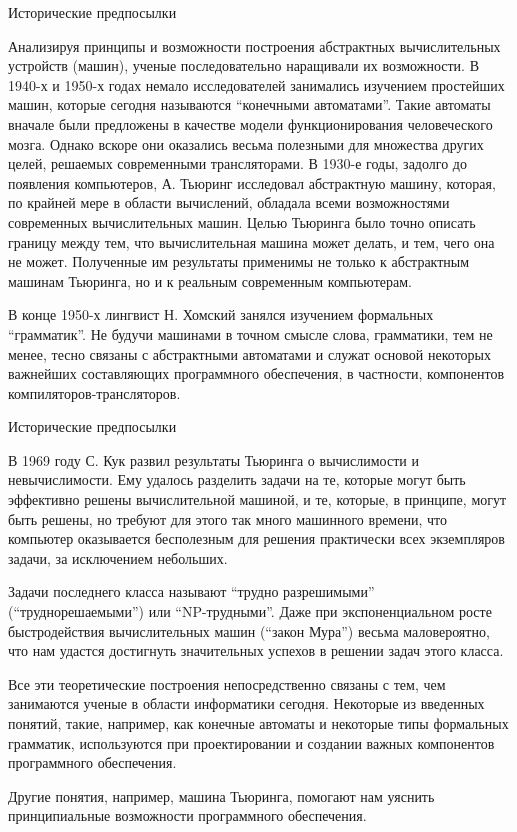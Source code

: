 \documentclass[12pt, pdf, hyperref={unicode},handout]{beamer}
\begin{document}
\begin{frame}{Исторические предпосылки}
  \begin{block}

    \small{
Анализируя принципы и возможности построения абстрактных вычислительных устройств (машин), ученые последовательно наращивали их возможности. В 1940-х и 1950-х годах немало исследователей занимались изучением простейших машин, которые сегодня называются “конечными автоматами”. Такие автоматы вначале были предложены в качестве модели функционирования человеческого мозга. Однако вскоре они оказались весьма полезными для множества других целей, решаемых современными трансляторами. В 1930-е годы, задолго до появления компьютеров, А. Тьюринг исследовал абстрактную машину, которая, по крайней мере в области вычислений, обладала всеми возможностями современных вычислительных машин. Целью Тьюринга было точно
описать границу между тем, что вычислительная машина может делать, и тем, чего она не может. Полученные им результаты применимы не только к абстрактным машинам Тьюринга, но и к реальным современным компьютерам.

В конце 1950-х лингвист Н. Хомский занялся изучением формальных “грамматик”. Не будучи машинами в точном смысле слова, грамматики, тем не менее, тесно связаны с абстрактными автоматами и служат основой некоторых важнейших составляющих программного обеспечения, в частности, компонентов компиляторов-трансляторов.

}

  \end{block}
  
\end{frame}

\begin{frame}{Исторические предпосылки}
  \begin{block}

    \small{
В 1969 году С. Кук развил результаты Тьюринга о вычислимости и невычислимости.
Ему удалось разделить задачи на те, которые могут быть эффективно решены вычислительной машиной, и те, которые, в принципе, могут быть решены, но требуют для этого так много машинного времени, что компьютер оказывается бесполезным для решения практически всех экземпляров задачи, за исключением небольших.

Задачи последнего класса называют “трудно разрешимыми” (“труднорешаемыми”) или “NP-трудными”.
Даже при экспоненциальном росте быстродействия вычислительных машин (“закон Мура”) весьма маловероятно, что нам удастся достигнуть значительных успехов в решении
задач этого класса.

Все эти теоретические построения непосредственно связаны с тем, чем занимаются
ученые в области информатики сегодня. Некоторые из введенных понятий, такие, например, как конечные автоматы и некоторые типы формальных грамматик, используются при проектировании и создании важных компонентов программного обеспечения.

Другие понятия, например, машина Тьюринга, помогают нам уяснить принципиальные возможности программного обеспечения.
}

  \end{block}
  
\end{frame}
\end{document}
